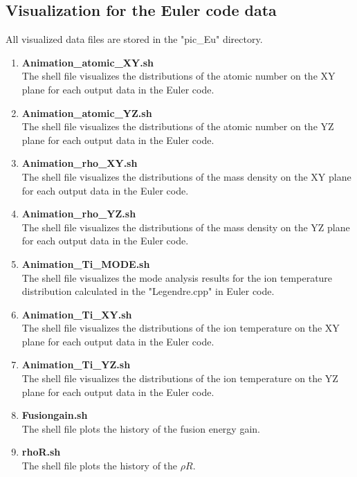 \subsection{Visualization for the Euler code data}
All visualized data files are stored in the "pic\_Eu" directory. 
\begin{enumerate}
\item{\bf Animation\_atomic\_XY.sh}\\
The shell file visualizes the distributions of the atomic number on the XY plane for each output data in the Euler code. 
\item{\bf Animation\_atomic\_YZ.sh}\\
The shell file visualizes the distributions of the atomic number on the YZ plane for each output data in the Euler code. 
\item{\bf Animation\_rho\_XY.sh}\\
The shell file visualizes the distributions of the mass density on the XY plane for each output data in the Euler code.  
\item{\bf Animation\_rho\_YZ.sh}\\
The shell file visualizes the distributions of the mass density on the YZ plane for each output data in the Euler code.  
\item{\bf Animation\_Ti\_MODE.sh} \\
The shell file visualizes the mode analysis results for the ion temperature distribution calculated in the "Legendre.cpp" in Euler code. 
\fi
\item{\bf Animation\_Ti\_XY.sh}\\
The shell file visualizes the distributions of the ion temperature on the XY plane for each output data in the Euler code. 
\item{\bf Animation\_Ti\_YZ.sh}\\
The shell file visualizes the distributions of the ion temperature on the YZ plane for each output data in the Euler code. 
\item{\bf Fusiongain.sh}\\
The shell file plots the history of the fusion energy gain. 
\item{\bf rhoR.sh}\\
The shell file plots the history of the $\rho R$. 
\end{enumerate}
%